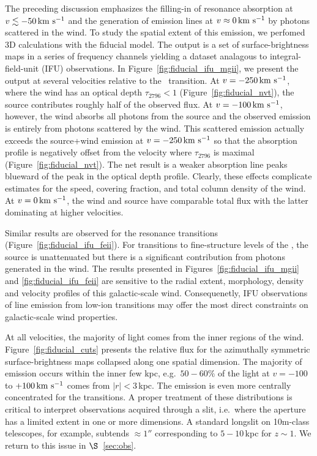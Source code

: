 \documentclass[12pt,preprint]{aastex}
\begin{document}
The preceding discussion emphasizes the filling-in of resonance absorption at $v
\lesssim -50 \, {\rm km~s^{-1}}$ and the generation of emission lines at $v \approx
0 \, {\rm km~s^{-1}}$ by photons scattered in the wind.  To study the spatial
extent of this emission, we perfomed 3D calculations with the fiducial
model.  The output is a set of surface-brightness maps in a series of
frequency channels yielding a
dataset analagous to integral-field-unit (IFU) observations.  In
Figure~\ref{fig:fiducial_ifu_mgii}, we present the output 
at several velocities relative to the \mgiia\
transition. At $v = -250 \, {\rm km~s^{-1}}$, where the wind has an optical
depth $\tau_{2796} < 1$ (Figure~\ref{fig:fiducial_nvt}),
the source contributes roughly half of the observed flux.  
At $v=-100 \, {\rm km~s^{-1}}$, however, the
wind absorbs all photons from the source and the observed emission is
entirely from photons scattered by the wind.  This scattered emission
actually exceeds the source+wind emission at 
$v = -250 \, {\rm km~s^{-1}}$ so that the absorption profile is
negatively offset from the velocity where $\tau_{2796}$ is maximal
(Figure~\ref{fig:fiducial_nvt}).
The net result is
a weaker  absorption line peaks blueward of the peak in the
optical depth profile.  Clearly, these effects complicate estimates for the
speed, covering fraction, and total column density of the wind.  At $v
= 0 \, {\rm km~s^{-1}}$, the wind and source have comparable total flux with the
latter dominating at higher velocities.  

Similar results are observed for the  resonance
transitions (Figure~\ref{fig:fiducial_ifu_feii}).
For transitions to fine-structure levels of the \aconfig, the source
is unattenuated but there is a significant contribution from photons
generated in the wind. 
The results presented in Figures~\ref{fig:fiducial_ifu_mgii} and
\ref{fig:fiducial_ifu_feii} are sensitive to the radial extent,
morphology, density and velocity profiles of this galactic-scale
wind.  Consequenetly, IFU observations of line emission from low-ion
transitions may offer the most direct constraints on galactic-scale
wind properties. 

At all velocities, the majority of light comes from the inner regions
of the wind. 
Figure~\ref{fig:fiducial_cuts} presents the relative flux for the 
azimuthally symmetric surface-brightness maps collapsed along
one spatial dimension.  The majority of
 emission occurs within the inner few kpc, e.g.\ $50-60\%$
of the light at $v=-100$ to $+100 \, {\rm km~s^{-1}}$
comes from $|r| < 3$\,kpc.
The emission
is even more centrally concentrated for the  transitions.
A proper treatment of these
distributions is critical to interpret observations
acquired through a slit, i.e.\ where the aperture has a limited extent
in one or more dimensions.  A standard longslit on 10m-class
telescopes, for example, subtends $\approx 1''$ corresponding to
$5-10$\,kpc for $z \sim 1$.    We return to this issue in
$\S$~\ref{sec:obs}. 
\end{document}
